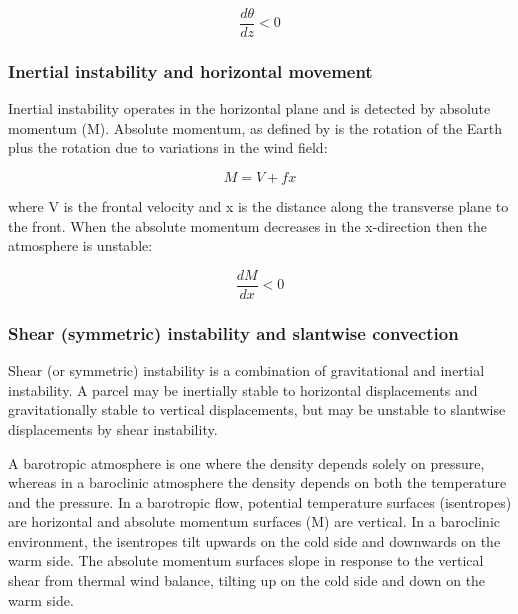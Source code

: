 \begin{equation} \label{eqgravinst}
\frac{d\theta}{dz} < 0
\end{equation}


\subsubsection {Inertial instability and horizontal movement}
Inertial instability operates in the horizontal plane and is detected by absolute momentum (M). Absolute momentum, as defined by \cite{eliassen1962vertical} is the rotation of the Earth plus the rotation due to variations in the wind field:

\begin{equation} \label{eqM}
M = V + fx
\end{equation}



where V is the frontal velocity and x is the distance along the transverse plane to the front. When the absolute momentum decreases in the x-direction then the atmosphere is unstable:

\begin{equation} \label{eq_iner_inst}
\frac{dM}{dx} < 0
\end{equation}


\subsubsection {Shear (symmetric) instability and slantwise convection}

Shear (or symmetric) instability is a combination of gravitational and inertial instability. A parcel may be inertially stable to horizontal displacements and gravitationally stable to vertical displacements, but may be unstable to slantwise displacements by shear instability. 

A barotropic atmosphere is one where the density depends solely on pressure, whereas in a baroclinic atmosphere the density depends on both the temperature and the pressure. In a barotropic flow, potential temperature surfaces (isentropes) are horizontal and absolute momentum surfaces (M) are vertical. In a baroclinic environment, the isentropes tilt upwards on the cold side and downwards on the warm side. The absolute momentum surfaces slope in response to the vertical shear from thermal wind balance, tilting up on the cold side and down on the warm side.
%

